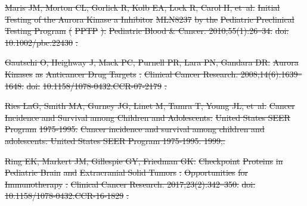 \documentclass[10pt,letterpaper]{article}
\providecommand{\DIFdeltex}[1]{{\protect\color{red}\sout{#1}}}                      %
\providecommand{\DIFdel}[1]{\texorpdfstring{\DIFdeltex{#1}}{}} %
\begin{document}
\begin{thebibliography}{10}
\DIFdel{Maris JM, Morton CL, Gorlick R, Kolb EA, Lock R, Carol H, et~al.
	}%
\DIFdel{Initial Testing of the Aurora Kinase a Inhibitor }%
\DIFdel{MLN8237}%
\DIFdel{by the
	}%
\DIFdel{Pediatric Preclinical Testing Program}%
\DIFdel{(}%
\DIFdel{PPTP}%
\DIFdel{).
	}%
\DIFdel{Pediatric Blood \& Cancer. 2010;55(1):26--34.
	}%
\DIFdel{doi:}%
\DIFdel{10.1002/pbc.22430}%
\DIFdel{.
	}%

\DIFdel{Gautschi O, Heighway J, Mack PC, Purnell PR, Lara PN, Gandara DR.
	}%
\DIFdel{Aurora }%
\DIFdel{Kinases}%
\DIFdel{as }%
\DIFdel{Anticancer Drug Targets}%
\DIFdel{.
	}%
\DIFdel{Clinical Cancer Research. 2008;14(6):1639--1648.
	}%
\DIFdel{doi:}%
\DIFdel{10.1158/1078-0432.CCR-07-2179}%
\DIFdel{.
	}%

\DIFdel{Ries LaG, Smith MA, Gurney JG, Linet M, Tamra T, Young JL, et~al.
	}%
\DIFdel{Cancer Incidence and Survival among Children and Adolescents:
	}%
\DIFdel{United States SEER Program}%
\DIFdel{1975-1995.
	}%
\DIFdel{Cancer incidence and survival among children and adolescents: United
	States SEER Program 1975-1995. 1999;.
	}%

\DIFdel{Ring EK, Markert JM, Gillespie GY, Friedman GK.
	}%
\DIFdel{Checkpoint }%
\DIFdel{Proteins}%
\DIFdel{in }%
\DIFdel{Pediatric Brain}%
\DIFdel{and }%
\DIFdel{Extracranial
			Solid Tumors}%
\DIFdel{: }%
\DIFdel{Opportunities}%
\DIFdel{for }%
\DIFdel{Immunotherapy}%
\DIFdel{.
	}%
\DIFdel{Clinical Cancer Research. 2017;23(2):342--350.
	}%
\DIFdel{doi:}%
\DIFdel{10.1158/1078-0432.CCR-16-1829}%
\DIFdel{.
	}%


\end{thebibliography}
\end{document}
